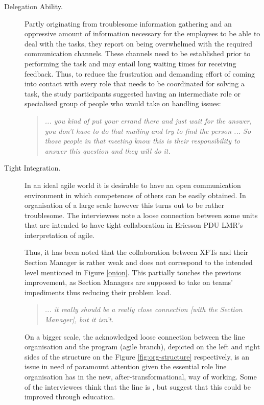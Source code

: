 \begin{description}

   \item[Delegation Ability.] Partly originating from troublesome information gathering and an oppressive amount of information necessary for the employees to be able to deal with the tasks, they report on being overwhelmed with the required communication channels. These channels need to be established prior to performing the task and may entail long waiting times for receiving feedback. Thus, to reduce the frustration and demanding effort of coming into contact with every role that needs to be coordinated for solving a task, the study participants suggested having an intermediate role or specialised group of people who would take on handling issues:
   
      \begin{quote}\itshape... you kind of put your errand there and just wait for the answer, you don't have to do that mailing and try to find the person ... So those people in that meeting know this is their responsibility to answer this question and they will do it.
      \end{quote}

   \item[Tight Integration.] In an ideal agile world it is desirable to have an open communication environment in which competences of others can be easily obtained. In organisation of a large scale however this turns out to be rather troublesome. The interviewees note a loose connection between some units that are intended to have tight collaboration in Ericsson PDU LMR's interpretation of agile. 
   
   Thus, it has been noted that the collaboration between \acp{XFT} and their Section Manager is rather weak and does not correspond to the intended level mentioned in Figure \ref{onion}. This partially touches the previous improvement, as Section Managers are supposed to take on teams' impediments thus reducing their problem load.
   
   \begin{quote}\itshape
   ... it really should be a really close connection [with the Section Manager], but it isn’t.
   \end{quote}
   
   On a bigger scale, the acknowledged loose connection between the line organisation and the program (agile branch), depicted on the left and right sides of the structure on the Figure \ref{fig:org-structure} respectively, is an issue in need of paramount attention given the essential role line organisation has in the new, after-transformational, way of working. Some of the interviewees think that the line is , but suggest that this could be improved through education.
   

\end{description}
